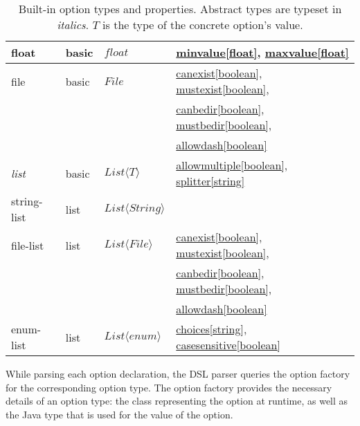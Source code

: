 \documentclass[a4paper]{article}
\begin{document}
\begin{table}[th]
\begin{tabular}{llll}
    float          & basic  & $float$ & \hyperref[prop:minvalue]{minvalue[float]}, \hyperref[prop:maxvalue]{maxvalue[float]} \\
    \midrule
    
    file           & basic  & $File$  & \hyperref[prop:canexist]{canexist[boolean]}, \hyperref[prop:mustexist]{mustexist[boolean]}, \\
                                      & & & \hyperref[prop:canbedir]{canbedir[boolean]}, \hyperref[prop:mustbedir]{mustbedir[boolean]}, \\
                                      & & & \hyperref[prop:allowdash]{allowdash[boolean]} \\
    \midrule
                                      
    \textit{list}  & basic  & $List\langle T \rangle$ & \hyperref[prop:allowmultiple]{allowmultiple[boolean]}, \hyperref[prop:splitter]{splitter[string]} \\
    \midrule
     
    string-list    & list   & $List\langle String \rangle$ &  \\
    \midrule
    
    file-list      & list   & $List\langle File \rangle$ & \hyperref[prop:canexist]{canexist[boolean]}, \hyperref[prop:mustexist]{mustexist[boolean]},   \\
                   &        &                            & \hyperref[prop:canbedir]{canbedir[boolean]}, \hyperref[prop:mustbedir]{mustbedir[boolean]},   \\
                   &        &                            & \hyperref[prop:allowdash]{allowdash[boolean]}                       \\
    \midrule
    
    enum-list      & list   & $List\langle enum \rangle$ & \hyperref[prop:choices]{choices[string]}, \hyperref[prop:casesensitive]{casesensitive[boolean]} \\
    \midrule
    
    \bottomrule
  \end{tabular}
  \caption{Built-in option types and properties. Abstract types are typeset in \textit{italics}. $T$ is the type of the concrete option's value. }
  \label{tbl:builtin-types}
\end{table}

While parsing each option declaration, the DSL parser queries the option factory for 
the corresponding option type. The option factory provides the necessary details of
an option type: the class representing the option at runtime, as well as the Java type
that is used for the value of the option. 
\end{document}
